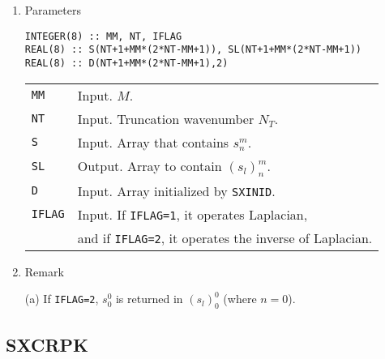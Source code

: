 \documentclass[a4paper]{scrartcl}
\begin{document}
\begin{enumerate}
\item Parameters

\begin{verbatim}
INTEGER(8) :: MM, NT, IFLAG
REAL(8) :: S(NT+1+MM*(2*NT-MM+1)), SL(NT+1+MM*(2*NT-MM+1))
REAL(8) :: D(NT+1+MM*(2*NT-MM+1),2)
\end{verbatim}

\begin{tabular}{ll}
\texttt{MM} & Input. $M$.\\  
\texttt{NT} & Input. Truncation wavenumber $N_T$.\\
\texttt{S} & Input. Array that contains $s^m_n$.\\
\texttt{SL} & Output. Array to contain $(s_l)^m_n$.\\
\texttt{D} & Input. Array initialized by  \texttt{SXINID}.\\
\texttt{IFLAG} & Input. If \texttt{IFLAG=1}, it operates Laplacian, \\
&  and if \texttt{IFLAG=2}, it operates the 
inverse of Laplacian.
\end{tabular}


\item Remark

(a) If \texttt{IFLAG=2}, $s^0_0$ is returned in $(s_l)^0_0$ (where $n=0$).  

\end{enumerate}


\subsection{SXCRPK}
\end{document}
